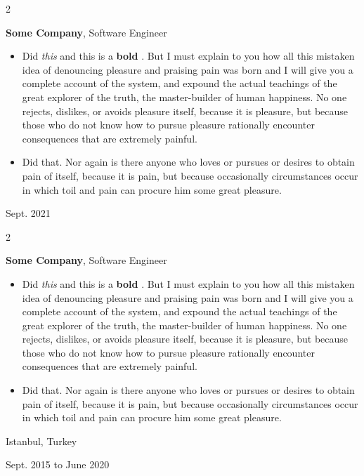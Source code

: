 \documentclass[10pt, letterpaper]{article}
\newenvironment{highlights}{
    \begin{itemize}[
        topsep=0.10 cm,
        parsep=0.10 cm,
        partopsep=0pt,
        itemsep=0pt,
        leftmargin=0.4 cm + 10pt
    ]
}{
    \end{itemize}
} %
\newenvironment{twocolentry}[2][]{
    \onecolentry
    \def\secondColumn{#2}
    \setcolumnwidth{\fill, 4.5 cm}
    \begin{paracol}{2}
}{
    \switchcolumn \raggedleft \secondColumn
    \end{paracol}
    \endonecolentry
} %
\let\hrefWithoutArrow\href
\renewcommand{\href}[2]{\hrefWithoutArrow{#1}{\mbox{\ifthenelse{\equal{#2}{}}{ }{#2 }\raisebox{.15ex}{\footnotesize \faExternalLink*}}}}
\begin{document}
        \vspace{0.2 cm}

        \begin{twocolentry}{
            Sept. 2021
        }
            \textbf{Some \textnormal{Company}}, Software Engineer
            \begin{highlights}
                \item Did \textit{this} and this is a \textbf{bold} \href{https://example.com}{link}. But I must explain to you how all this mistaken idea of denouncing pleasure and praising pain was born and I will give you a complete account of the system, and expound the actual teachings of the great explorer of the truth, the master-builder of human happiness. No one rejects, dislikes, or avoids pleasure itself, because it is pleasure, but because those who do not know how to pursue pleasure rationally encounter consequences that are extremely painful.
                \item Did that. Nor again is there anyone who loves or pursues or desires to obtain pain of itself, because it is pain, but because occasionally circumstances occur in which toil and pain can procure him some great pleasure.
            \end{highlights}
        \end{twocolentry}


        \vspace{0.2 cm}

        \begin{twocolentry}{
            Istanbul, Turkey

        Sept. 2015 to June 2020
        }
            \textbf{Some \textnormal{Company}}, Software Engineer
            \begin{highlights}
                \item Did \textit{this} and this is a \textbf{bold} \href{https://example.com}{link}. But I must explain to you how all this mistaken idea of denouncing pleasure and praising pain was born and I will give you a complete account of the system, and expound the actual teachings of the great explorer of the truth, the master-builder of human happiness. No one rejects, dislikes, or avoids pleasure itself, because it is pleasure, but because those who do not know how to pursue pleasure rationally encounter consequences that are extremely painful.
                \item Did that. Nor again is there anyone who loves or pursues or desires to obtain pain of itself, because it is pain, but because occasionally circumstances occur in which toil and pain can procure him some great pleasure.
            \end{highlights}
        \end{twocolentry}
\end{document}
